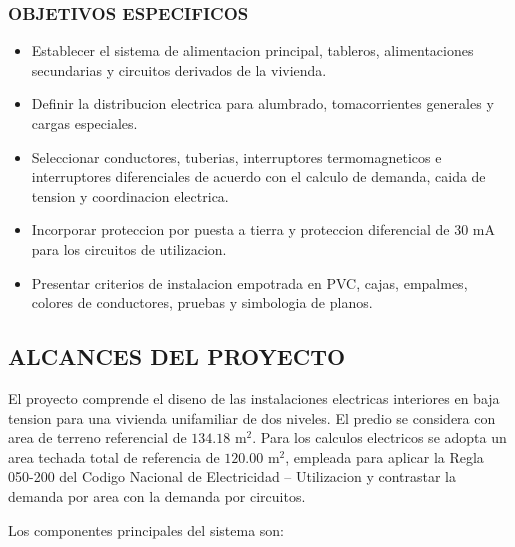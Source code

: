 \subsubsection{OBJETIVOS ESPECIFICOS}

\begin{itemize}
  \item Establecer el sistema de alimentacion principal, tableros, alimentaciones secundarias y circuitos derivados de la vivienda.
  \item Definir la distribucion electrica para alumbrado, tomacorrientes generales y cargas especiales.
  \item Seleccionar conductores, tuberias, interruptores termomagneticos e interruptores diferenciales de acuerdo con el calculo de demanda, caida de tension y coordinacion electrica.
  \item Incorporar proteccion por puesta a tierra y proteccion diferencial de 30 mA para los circuitos de utilizacion.
  \item Presentar criterios de instalacion empotrada en PVC, cajas, empalmes, colores de conductores, pruebas y simbologia de planos.
\end{itemize}

\subsection{ALCANCES DEL PROYECTO}

El proyecto comprende el diseno de las instalaciones electricas interiores en baja tension para una vivienda unifamiliar de dos niveles. El predio se considera con area de terreno referencial de \(134.18\text{ m}^2\). Para los calculos electricos se adopta un area techada total de referencia de \(120.00\text{ m}^2\), empleada para aplicar la Regla 050-200 del Codigo Nacional de Electricidad -- Utilizacion y contrastar la demanda por area con la demanda por circuitos.

Los componentes principales del sistema son:

